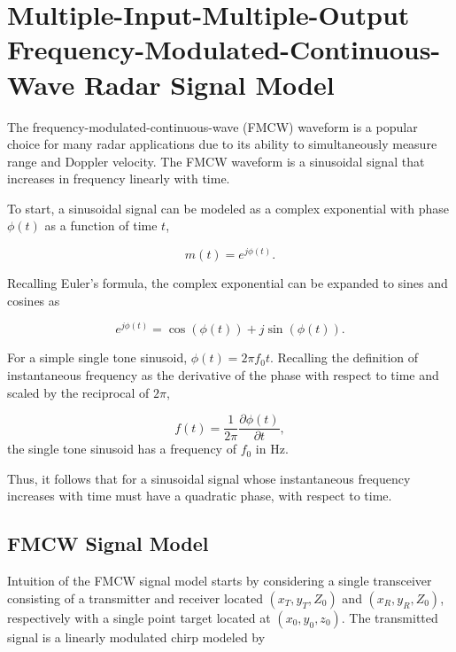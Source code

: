 \section{Multiple-Input-Multiple-Output Frequency-Modulated-Continuous-Wave Radar Signal Model}
\label{sec:mimo fmcw radar signal model}

The frequency-modulated-continuous-wave (FMCW) waveform is a popular choice for many radar applications due to its ability to simultaneously measure range and Doppler velocity. The FMCW waveform is a sinusoidal signal that increases in frequency linearly with time.

To start, a sinusoidal signal can be modeled as a complex exponential with phase $\phi(t)$ as a function of time $t$,

\begin{equation}
	m(t) = e^{j\phi(t)}.
\end{equation}

Recalling Euler's formula, the complex exponential can be expanded to sines and cosines as

\begin{equation}
	e^{j\phi(t)} = \cos(\phi(t)) + j\sin(\phi(t)).
\end{equation}

For a simple single tone sinusoid, $\phi(t) = 2\pi f_0 t$. Recalling the definition of instantaneous frequency as the derivative of the phase with respect to time and scaled by the reciprocal of $2\pi$, 

\begin{equation}
	\label{eq:instantaneous frequency}
	f(t) = \frac{1}{2\pi} \frac{\partial \phi(t)}{\partial t},
\end{equation}
the single tone sinusoid has a frequency of $f_0$ in Hz.

Thus, it follows that for a sinusoidal signal whose instantaneous frequency increases with time must have a quadratic phase, with respect to time.



\subsection{FMCW Signal Model}
\label{subsec:fmcw signal model}

Intuition of the FMCW signal model starts by considering a single transceiver consisting of a transmitter and receiver located $(x_T,y_T,Z_0)$ and $(x_R,y_R,Z_0)$, respectively with a single point target located at $(x_0,y_0,z_0)$. The transmitted signal is a linearly modulated chirp modeled by 

